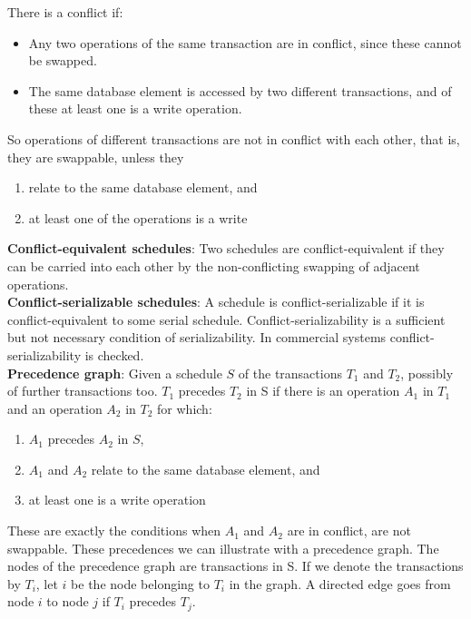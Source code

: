 \documentclass[margin=0px]{article}
\begin{document}
\noindent There is a conflict if:
\begin{itemize}
    \item	Any two operations of the same transaction are in conflict, since these cannot be swapped.
    \item	The same database element is accessed by two different transactions, and of these at least one is a write operation.
\end{itemize}

So operations of different transactions are not in conflict with each other, that is, they are swappable, unless they
\begin{enumerate}
    \item	relate to the same database element, and
    \item	at least one of the operations is a write
\end{enumerate}

\noindent \textbf{Conflict-equivalent schedules}: Two schedules are conflict-equivalent if they can be carried into each other by the non-conflicting
swapping of adjacent operations.\\

\noindent \textbf{Conflict-serializable schedules}: A schedule is conflict-serializable if it is conflict-equivalent to some
serial schedule. Conflict-serializability is a sufficient but not necessary condition of serializability. In commercial systems
conflict-serializability is checked.\\

\noindent \textbf{Precedence graph}: Given a schedule $S$ of the transactions $T_{1}$ and $T_{2}$, possibly of further transactions too.
$T_{1}$ precedes $T_{2}$ in S if there is an operation $A_{1}$ in $T_{1}$ and an operation $A_{2}$ in $T_{2}$ for which:
\begin{enumerate}
    \item	$A_{1}$ precedes $A_{2}$ in $S$,
    \item	$A_{1}$ and $A_{2}$ relate to the same database element, and
    \item	at least one is a write operation
\end{enumerate}
These are exactly the conditions when $A_{1}$ and $A_{2}$ are in conflict, are not swappable. These precedences we can illustrate with a precedence
graph. The nodes of the precedence graph are transactions in S. If we denote the transactions by $T_{i}$, let $i$
be the node belonging to $T_{i}$ in the graph. A directed edge goes from node $i$ to node $j$ if $T_{i}$ precedes $T_{j}$.\\
\end{document}

